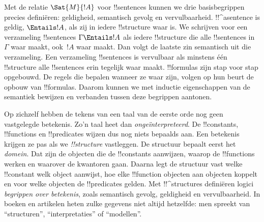 \documentclass[openany]{memoir}
\begin{document}
Met de relatie $\Sat{M}{!A}$ voor !!{sentence}s kunnen we drie
basisbegrippen precies definiëren: geldigheid, semantisch gevolg en
vervulbaarheid. !!^a{sentence} is geldig, $\Entails !A$, als zij in
iedere !!{structure} waar is. We schrijven voor een verzameling
!!{sentence}s $\Gamma \Entails !A$ als iedere !!{structure} die alle
!!{sentence}s in~$\Gamma$ waar maakt, ook~$!A$ waar maakt. Dan volgt de
laatste zin semantisch uit die verzameling. Een verzameling
!!{sentence}s is vervulbaar als minstens één !!{structure} alle
!!{sentence}s erin tegelijk waar maakt. !!{formula}s zijn stap voor
stap opgebouwd. De regels die bepalen wanneer ze waar zijn, volgen op
hun beurt de opbouw van !!{formula}s. Daarom kunnen we met inductie
eigenschappen van de semantiek bewijzen en verbanden tussen deze
begrippen aantonen.
\endgroup

\begingroup
\def\olfilename{OLP-0161}
\def\olfilepath{content/first-order-logic/syntax-and-semantics/}
\hypertarget{unit-OLP-0161}{}





\begin{explain}
Op zichzelf hebben de tekens van een taal van de eerste orde nog geen
vastgelegde betekenis. Zo'n taal heet dan \emph{ongeïnterpreteerd}. De
!!{constant}s, !!{function}s en !!{predicate}s wijzen dus nog niets
bepaalds aan. Een betekenis krijgen ze pas als we
 \emph{!!{structure}} vastleggen. De structuur
bepaalt eerst het \emph{domein}. Dat zijn de objecten die de
!!{constant}s aanwijzen, waarop de !!{function}s werken en waarover de
kwantoren gaan. Daarna legt de structuur vast welke !!{constant} welk
object aanwijst, hoe elke !!{function} objecten aan objecten koppelt en
voor welke objecten de !!{predicate}s gelden. Met !!^{structure}s
definiëren logici \emph{begrippen over betekenis}, zoals semantisch gevolg,
geldigheid en vervulbaarheid. In boeken en artikelen heten zulke
gegevens niet altijd hetzelfde: men spreekt van ``structuren'',
``interpretaties'' of ``modellen''.
\end{explain}
\end{document}

